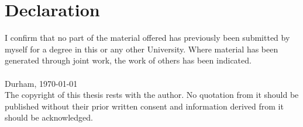 \chapter*{Declaration}
I confirm that no part of the material offered has previously been submitted by myself for a degree in this or any other University.  Where material has been generated through joint work, the work of others has been indicated.\\
\vspace{2truecm}
\hspace{2truecm} \myname\\
\hspace{2truecm}Durham, \today \vspace{5truecm}\\
The copyright of this thesis rests with the author.  No quotation
from it should be published without their prior written consent and
information derived from it should be acknowledged.